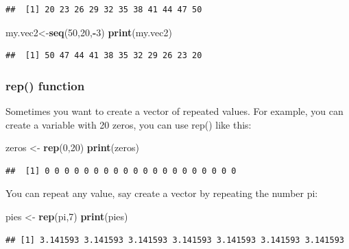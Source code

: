 \documentclass[
]{book}
\newenvironment{Shaded}{\begin{snugshade}}{\end{snugshade}}
\newcommand{\DecValTok}[1]{\textcolor[rgb]{0.00,0.00,0.81}{#1}}
\newcommand{\KeywordTok}[1]{\textcolor[rgb]{0.13,0.29,0.53}{\textbf{#1}}}
\newcommand{\NormalTok}[1]{#1}
\newcommand{\OperatorTok}[1]{\textcolor[rgb]{0.81,0.36,0.00}{\textbf{#1}}}
\newcommand{\StringTok}[1]{\textcolor[rgb]{0.31,0.60,0.02}{#1}}
\begin{document}
\begin{verbatim}
##  [1] 20 23 26 29 32 35 38 41 44 47 50
\end{verbatim}

\begin{Shaded}
\begin{Highlighting}[]
\NormalTok{my.vec2\textless{}{-}}\KeywordTok{seq}\NormalTok{(}\DecValTok{50}\NormalTok{,}\DecValTok{20}\NormalTok{,}\OperatorTok{{-}}\DecValTok{3}\NormalTok{)}
\KeywordTok{print}\NormalTok{(my.vec2)}
\end{Highlighting}
\end{Shaded}

\begin{verbatim}
##  [1] 50 47 44 41 38 35 32 29 26 23 20
\end{verbatim}

\hypertarget{rep-function}{%
\subsubsection{rep() function}\label{rep-function}}

Sometimes you want to create a vector of repeated values. For example, you can create a variable with 20 zeros, you can use rep() like this:

\begin{Shaded}
\begin{Highlighting}[]
\NormalTok{zeros \textless{}{-}}\StringTok{ }\KeywordTok{rep}\NormalTok{(}\DecValTok{0}\NormalTok{,}\DecValTok{20}\NormalTok{)}
\KeywordTok{print}\NormalTok{(zeros)}
\end{Highlighting}
\end{Shaded}

\begin{verbatim}
##  [1] 0 0 0 0 0 0 0 0 0 0 0 0 0 0 0 0 0 0 0 0
\end{verbatim}

You can repeat any value, say create a vector by repeating the number pi:

\begin{Shaded}
\begin{Highlighting}[]
\NormalTok{pies \textless{}{-}}\StringTok{ }\KeywordTok{rep}\NormalTok{(pi,}\DecValTok{7}\NormalTok{)}
\KeywordTok{print}\NormalTok{(pies)}
\end{Highlighting}
\end{Shaded}

\begin{verbatim}
## [1] 3.141593 3.141593 3.141593 3.141593 3.141593 3.141593 3.141593
\end{verbatim}
\end{document}
